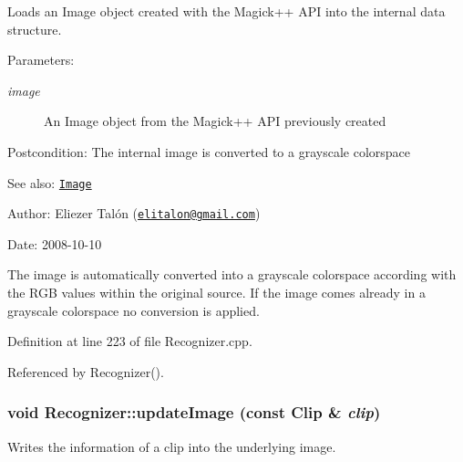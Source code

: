 Loads an Image object created with the Magick++ API into the internal data structure. 

\begin{Desc}
\item[Parameters:]
\begin{description}
\item[{\em image}]An Image object from the Magick++ API previously created\end{description}
\end{Desc}
\begin{Desc}
\item[Postcondition:]The internal image is converted to a grayscale colorspace\end{Desc}
\begin{Desc}
\item[See also:]\href{http://www.imagemagick.org/Magick++/Image.html}{\tt Image}\end{Desc}
\begin{Desc}
\item[Author:]Eliezer Talón (\href{mailto:elitalon@gmail.com}{\tt elitalon@gmail.com}) \end{Desc}
\begin{Desc}
\item[Date:]2008-10-10\end{Desc}
The image is automatically converted into a grayscale colorspace according with the RGB values within the original source. If the image comes already in a grayscale colorspace no conversion is applied. 

Definition at line 223 of file Recognizer.cpp.

Referenced by Recognizer().\hypertarget{class_recognizer_0779d8bb035f7d51cb26fdc3d410e019}{
\subsubsection[updateImage]{\setlength{\rightskip}{0pt plus 5cm}void Recognizer::updateImage (const {\bf Clip} \& {\em clip})}}
\label{class_recognizer_0779d8bb035f7d51cb26fdc3d410e019}


Writes the information of a clip into the underlying image. 


